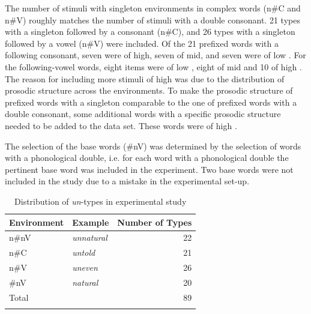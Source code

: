 The number of stimuli with singleton environments in complex words (n\#C and n\#V) roughly matches the number of stimuli with a double consonant. 21 types with a  singleton followed by a consonant ({n\#C}), and 26 types with a singleton followed by a vowel ({n\#V}) were included. 
Of the 21 prefixed words with a following consonant, seven were of high, seven of mid, and seven were of low .
For the following-vowel words, eight items were of low , eight of mid  and 10 of high . The reason for including more stimuli of high  was due to the distribution of prosodic structure across the environments. To make the prosodic structure of prefixed words with a singleton comparable to the one of prefixed words with a double consonant, some additional words with a specific prosodic structure needed to be added to the data set. These words were of high .




The selection of the base words ({\#nV}) was determined by the selection of words with a phonological double, i.e.  for each word with a phonological double the pertinent base word was included in the experiment. Two base words were not included in the study due to a mistake in the experimental set-up. 





\begin{table}
	\caption{Distribution of  \textit{un}-types in experimental study}
	\label{tbl:distribution of un types in experiment}

	
		\begin{tabular} {llr}
\lsptoprule
			Environment & Example & Number of  Types\\

			\midrule
			n\#nV&\textit{unnatural} & 22\\ 
			n\#C& \textit{untold} & 21\\ 
			n\#V& \textit{uneven} & 26 \\
			\#nV& \textit{natural} & 20 \\ 
			\midrule
			Total&  & 89 \\ 
			\lspbottomrule                                                                                
		\end{tabular}
		

	
\end{table}



